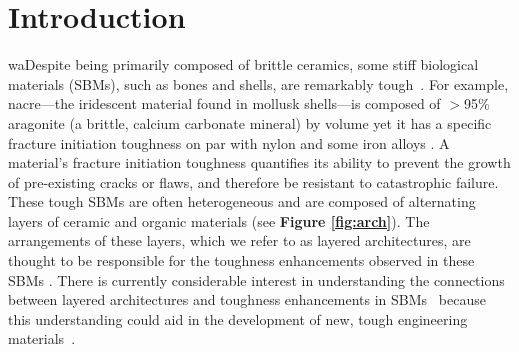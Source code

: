 \documentclass[12pt,onecolumn]{article}
\begin{document}
\section*{Introduction}
waDespite being primarily composed of brittle ceramics, some stiff biological materials (SBMs), such as bones and shells, are remarkably tough~\cite{ritchie2011conflicts, wegst2015bioinspired, wang2001, gao2017mass}. For example, nacre---the iridescent material found in mollusk shells---is composed of $>$95\% aragonite (a brittle, calcium carbonate mineral) by volume yet it has a specific fracture initiation toughness on par with nylon and some iron alloys \cite{gao2017mass}. A material's fracture initiation toughness quantifies its ability to prevent the growth of pre-existing cracks or flaws, and therefore be resistant to catastrophic failure. These tough SBMs are often heterogeneous and are composed of alternating layers of ceramic and organic materials (see {\bf Figure \ref{fig:arch}}). The arrangements of these layers, which we refer to as layered architectures, are thought to be responsible for the toughness enhancements observed in these SBMs \cite{mayer2011new}. There is currently considerable interest in understanding the connections between layered architectures and toughness enhancements in SBMs~\cite{mayer2011new,mayer2005rigid,rabiei2010failure, kolednik2011bioinspired} because this understanding could aid in the development of new, tough engineering materials~\cite{munch2008tough,karambelas2013strombus,gao2017mass}.
%
\end{document}
